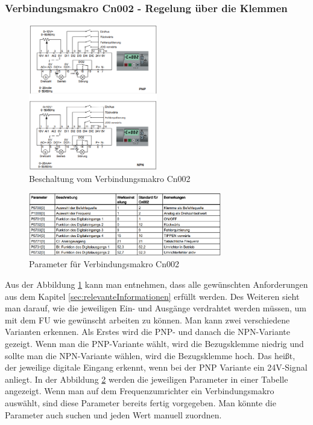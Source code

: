 \newpage

\subsubsection{Verbindungsmakro Cn002 - Regelung über die Klemmen \cite{DatenblattFU}}
\label{sec:verbindungsmakro}

\begin{figure}[H]
\begin{center}
	\includegraphics[width=0.5\textwidth]{fig/VerbindungsmakroAufbau}
	\caption{Beschaltung vom Verbindungsmakro Cn002 \label{fig:verbindungsmakro}}
\end{center}
\end{figure}

\begin{figure}[H]
\begin{center}
	\includegraphics[width=0.75\textwidth]{fig/VerbindungsmakroParameter}
	\caption{Parameter für Verbindungsmakro Cn002 \label{fig:parameterVerbindungsmakro}}
\end{center}
\end{figure}

Aus der Abbildung \ref{fig:verbindungsmakro} kann man entnehmen, dass alle gewünschten Anforderungen aus dem Kapitel \ref{sec:relevanteInformationen} erfüllt werden. Des Weiteren sieht man darauf, wie die jeweiligen Ein- und Ausgänge verdrahtet werden müssen, um mit dem \ac{FU} wie gewünscht arbeiten zu können. Man kann zwei verschiedene Varianten erkennen. Als Erstes wird die PNP- und danach die NPN-Variante gezeigt. Wenn man die PNP-Variante wählt, wird die Bezugsklemme niedrig und sollte man die NPN-Variante wählen, wird die Bezugsklemme hoch. Das heißt, der jeweilige digitale Eingang erkennt, wenn bei der PNP Variante ein 24V-Signal anliegt. In der Abbildung \ref{fig:parameterVerbindungsmakro} werden die jeweiligen Parameter in einer Tabelle angezeigt. Wenn man auf dem Frequenzumrichter ein Verbindungsmakro auswählt, sind diese Parameter bereits fertig vorgegeben. Man könnte die Parameter auch suchen und jeden Wert manuell zuordnen. \newpage 

